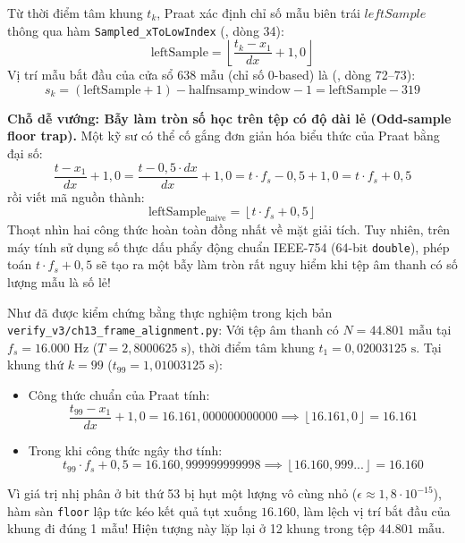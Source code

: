 Từ thời điểm tâm khung $t_k$, Praat xác định chỉ số mẫu biên trái $leftSample$ thông qua hàm \texttt{Sampled\_xToLowIndex} (, dòng 34):
\begin{equation}
    \text{leftSample} = \left\lfloor \frac{t_k - x_1}{dx} + 1{,}0 \right\rfloor
\end{equation}
Vị trí mẫu bắt đầu của cửa sổ 638 mẫu (chỉ số 0-based) là (, dòng 72--73):
\begin{equation}
    s_k = (\text{leftSample} + 1) - \text{halfnsamp\_window} - 1 = \text{leftSample} - 319
\end{equation}

\textbf{Chỗ dễ vướng: Bẫy làm tròn số học trên tệp có độ dài lẻ (Odd-sample floor trap).} 
Một kỹ sư có thể cố gắng đơn giản hóa biểu thức của Praat bằng đại số:
\begin{equation}
    \frac{t - x_1}{dx} + 1{,}0 = \frac{t - 0{,}5 \cdot dx}{dx} + 1{,}0 = t \cdot f_s - 0{,}5 + 1{,}0 = t \cdot f_s + 0{,}5
\end{equation}
rồi viết mã nguồn thành:
\begin{equation}
    \text{leftSample}_{\text{naive}} = \left\lfloor t \cdot f_s + 0{,}5 \right\rfloor
\end{equation}
Thoạt nhìn hai công thức hoàn toàn đồng nhất về mặt giải tích. Tuy nhiên, trên máy tính sử dụng số thực dấu phẩy động chuẩn IEEE-754 (64-bit \texttt{double}), phép toán $t \cdot f_s + 0{,}5$ sẽ tạo ra một bẫy làm tròn rất nguy hiểm khi tệp âm thanh có số lượng mẫu là số lẻ!

Như đã được kiểm chứng bằng thực nghiệm trong kịch bản \texttt{verify\_v3/ch13\_frame\_alignment.py}: Với tệp âm thanh có $N = 44.801\text{ mẫu}$ tại $f_s = 16.000\text{ Hz}$ ($T = 2{,}8000625\text{ s}$), thời điểm tâm khung $t_1 = 0{,}02003125\text{ s}$. Tại khung thứ $k = 99$ ($t_{99} = 1{,}01003125\text{ s}$):
\begin{itemize}
    \item Công thức chuẩn của Praat tính:
    \begin{equation}
        \frac{t_{99} - x_1}{dx} + 1{,}0 = 16.161{,}000000000000 \implies \left\lfloor 16.161{,}0 \right\rfloor = 16.161
    \end{equation}
    \item Trong khi công thức ngây thơ tính:
    \begin{equation}
        t_{99} \cdot f_s + 0{,}5 = 16.160{,}999999999998 \implies \left\lfloor 16.160{,}999... \right\rfloor = 16.160
    \end{equation}
\end{itemize}
Vì giá trị nhị phân ở bit thứ 53 bị hụt một lượng vô cùng nhỏ ($\epsilon \approx 1{,}8 \cdot 10^{-15}$), hàm sàn \texttt{floor} lập tức kéo kết quả tụt xuống $16.160$, làm lệch vị trí bắt đầu của khung đi đúng 1 mẫu! Hiện tượng này lặp lại ở 12 khung trong tệp $44.801\text{ mẫu}$.

